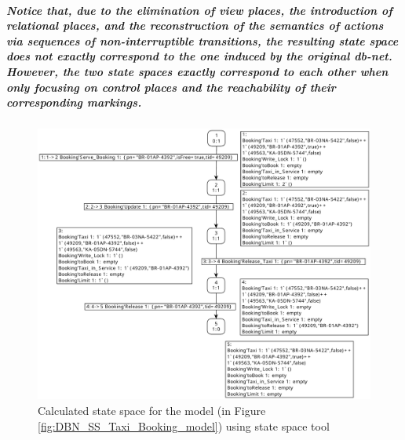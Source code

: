 \subparagraph*{\textnormal{Notice that, due to the elimination of view places, the introduction of relational places, and the reconstruction of the semantics of actions via sequences of non-interruptible transitions, the resulting state space does not exactly correspond to the one induced by the original db-net. However, the two state spaces exactly correspond to each other when only focusing on control places and the reachability of their corresponding markings.}}

\begin{figure}[!htbp]
	\centering
	\includegraphics[scale = 0.40]{DBN_SS_Correct_CPN_Tools.pdf}
	\caption{Calculated state space for the model (in Figure \ref{fig:DBN_SS_Taxi_Booking_model}) using state space tool}
	\label{fig:DBN_SS_Correct_CPN_Tools}
\end{figure}




